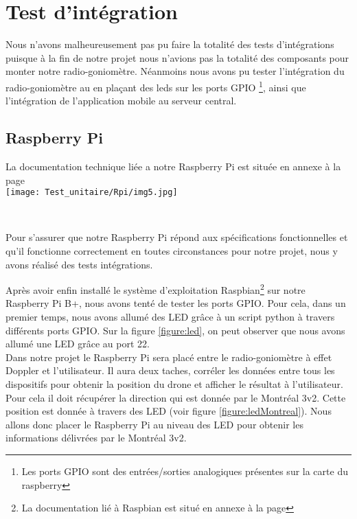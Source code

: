 
\chapter{Test d'intégration}

Nous n'avons malheureusement pas pu faire la totalité des tests d'intégrations puisque à la fin de notre projet nous n'avions pas la totalité des composants pour monter notre radio-goniomètre. Néanmoins nous avons pu tester l'intégration du radio-goniomètre au \rpi en plaçant des leds sur les ports GPIO \footnote{Les ports GPIO sont des entrées/sorties analogiques présentes sur la carte du raspberry}, ainsi que l'intégration de l'application mobile au serveur central.


\section{Raspberry Pi}
La documentation technique liée a notre Raspberry Pi est située en annexe à la page \pageref{annexe:rpi}
~\\

\texttt{[image: Test\_unitaire/Rpi/img5.jpg]}

~\\
\parindent=15pt

Pour s'assurer que notre Raspberry Pi répond aux spécifications fonctionnelles et qu'il fonctionne correctement en toutes circonstances pour notre projet, nous y avons réalisé des tests intégrations.

Après avoir enfin installé le système d'exploitation Raspbian\footnote{La documentation lié à Raspbian est situé en annexe à la page \pageref{annexe:raspbian}} sur notre Raspberry Pi B+, nous avons tenté de tester les ports GPIO. Pour cela, dans un premier temps, nous avons allumé des LED grâce à un script python à travers différents ports GPIO. Sur la figure \ref{figure:led}, on peut observer que nous avons allumé une LED grâce au port 22.
~\\

Dans notre projet le Raspberry Pi sera placé entre le radio-goniomètre à effet Doppler et l'utilisateur. Il aura deux taches, corréler les données entre tous les dispositifs pour obtenir la position du drone et afficher le résultat à l'utilisateur. Pour cela il doit récupérer la direction qui est donnée par le Montréal 3v2. Cette position est donnée à travers des LED (voir figure \ref{figure:ledMontreal}). Nous allons donc placer le Raspberry Pi au niveau des LED pour obtenir les informations délivrées par le Montréal 3v2. %

